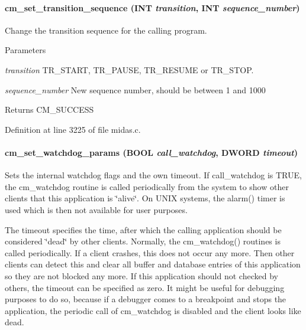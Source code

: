\paragraph[{cm\_\-set\_\-transition\_\-sequence}]{ cm\_\-set\_\-transition\_\-sequence ({\bf INT} {\em transition}, \/  {\bf INT} {\em sequence\_\-number})}\hfill\label{group__cmfunctionc_gac4b2b97d9cd12320b6f910f32e131aef}
Change the transition sequence for the calling program. 
\begin{DoxyParams}{Parameters}
\item[{\em transition}]TR\_\-START, TR\_\-PAUSE, TR\_\-RESUME or TR\_\-STOP. \item[{\em sequence\_\-number}]New sequence number, should be between 1 and 1000 \end{DoxyParams}
\begin{DoxyReturn}{Returns}
CM\_\-SUCCESS 
\end{DoxyReturn}


Definition at line 3225 of file midas.c.
\paragraph[{cm\_\-set\_\-watchdog\_\-params}]{ cm\_\-set\_\-watchdog\_\-params ({\bf BOOL} {\em call\_\-watchdog}, \/  {\bf DWORD} {\em timeout})}\hfill\label{group__cmfunctionc_gaf98a4288e4c02da7c75f3e0326ff0e72}
Sets the internal watchdog flags and the own timeout. If call\_\-watchdog is TRUE, the cm\_\-watchdog routine is called periodically from the system to show other clients that this application is \char`\"{}alive\char`\"{}. On UNIX systems, the alarm() timer is used which is then not available for user purposes.

The timeout specifies the time, after which the calling application should be considered \char`\"{}dead\char`\"{} by other clients. Normally, the cm\_\-watchdog() routines is called periodically. If a client crashes, this does not occur any more. Then other clients can detect this and clear all buffer and database entries of this application so they are not blocked any more. If this application should not checked by others, the timeout can be specified as zero. It might be useful for debugging purposes to do so, because if a debugger comes to a breakpoint and stops the application, the periodic call of cm\_\-watchdog is disabled and the client looks like dead.


